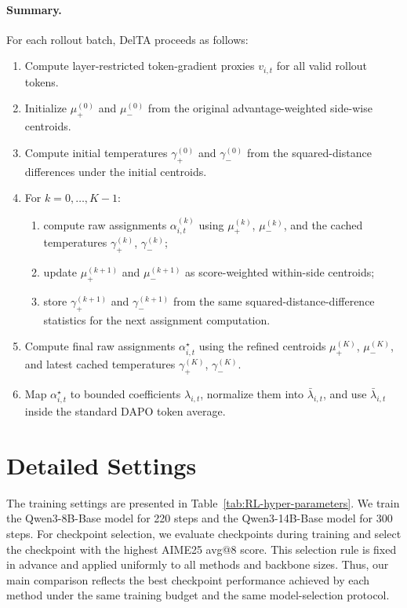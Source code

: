 \documentclass{article} %
\begin{document}
\paragraph{Summary.}
For each rollout batch, DelTA proceeds as follows:
\begin{enumerate}
    \item Compute layer-restricted token-gradient proxies \(v_{i,t}\) for all valid rollout tokens.
    \item Initialize \(\mu_+^{(0)}\) and \(\mu_-^{(0)}\) from the original advantage-weighted side-wise centroids.
    \item Compute initial temperatures \(\gamma_+^{(0)}\) and \(\gamma_-^{(0)}\) from the squared-distance differences under the initial centroids.
    \item For \(k=0,\dots,K-1\):
    \begin{enumerate}
        \item compute raw assignments \(\alpha_{i,t}^{(k)}\) using \(\mu_+^{(k)}\), \(\mu_-^{(k)}\), and the cached temperatures \(\gamma_+^{(k)}\), \(\gamma_-^{(k)}\);
        \item update \(\mu_+^{(k+1)}\) and \(\mu_-^{(k+1)}\) as score-weighted within-side centroids;
        \item store \(\gamma_+^{(k+1)}\) and \(\gamma_-^{(k+1)}\) from the same squared-distance-difference statistics for the next assignment computation.
    \end{enumerate}
    \item Compute final raw assignments \(\alpha_{i,t}^{\star}\) using the refined centroids \(\mu_+^{(K)}\), \(\mu_-^{(K)}\), and latest cached temperatures \(\gamma_+^{(K)}\), \(\gamma_-^{(K)}\).
    \item Map \(\alpha_{i,t}^{\star}\) to bounded coefficients \(\lambda_{i,t}\), normalize them into \(\bar\lambda_{i,t}\), and use \(\bar\lambda_{i,t}\) inside the standard DAPO token average.
\end{enumerate}

\section{Detailed Settings}
\label{app:hyp}
The training settings are presented in Table~\ref{tab:RL-hyper-parameters}. We train the Qwen3-8B-Base model for 220 steps and the Qwen3-14B-Base model for 300 steps. For checkpoint selection, we evaluate checkpoints during training and select the checkpoint with the highest AIME25 avg@8 score. This selection rule is fixed in advance and applied uniformly to all methods and backbone sizes. Thus, our main comparison reflects the best checkpoint performance achieved by each method under the same training budget and the same model-selection protocol. 
\end{document}
